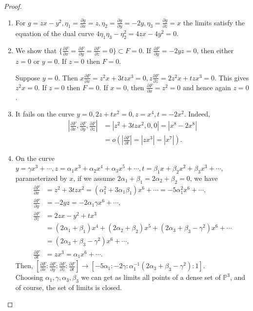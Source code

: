 \documentclass[12pt]{amsart}
\theoremstyle{definition}
\numberwithin{equation}{section}
\begin{document}
\begin {proof}
\begin{enumerate}
\item
For $g=zx-y^2, \eta_1=\frac{\partial g}{\partial x}=z, \eta_2=\frac{\partial g}{\partial y}=-2y, \eta_3=\frac{\partial g}{\partial z}=x$ the limits satisfy the equation of the dual curve $4\eta_1\eta_3-\eta_2^2=4zx-4y^2=0$.
\item  
We show that $\{\frac { \partial F} {\partial x} =\frac {\partial F} {\partial y} = \frac {\partial F} {\partial z}=0\}\subset F=0$.  
If $\frac {\partial F} {\partial y}=-2yz=0$, then either $z=0$ or $y=0$. 
If $z=0$ then $F=0$. 

Suppose $y=0$.  Then $x\frac {\partial F} {\partial x}=z^2x+3tzx^3=0, z\frac {\partial F} {\partial z}=2z^2x+tzx^3=0$.  
This gives $z^2x=0$. If $z=0$ then $F=0$. If $x=0$, then $\frac {\partial F} {\partial x}=z^2=0$ and hence again $z=0$.
\item 
It fails on the curve $y=0, 2z+tx^2=0, z=x^4, t=-2x^2.$
Indeed, 
\begin{align*}
 \left |\frac {\partial F} {\partial x}, \frac {\partial F} {\partial y}, \frac {\partial F} {\partial z} \right | &=|z^2+3tzx^2,0,0|=|x^8-2x^8| \\ 
& = o\left (\left |\frac {\partial F} {\partial t}\right |=|zx^3|=|x^7| \right ). 
\end{align*} 
\item 
On the curve $y=\gamma x^3+ \cdots , z=\alpha_1x^3+\alpha_2x^4+\alpha_3x^5+ \cdots , t=\beta_1x+\beta_2 x^2+\beta_3x^3+ \cdots $, parameterized by $x$,  if we assume $2\alpha_1+\beta_1=2\alpha_2+\beta_2=0$, we have 
\begin{align*}
 \frac {\partial F} {\partial x} & =z^2+3tzx^2=(\alpha_1^2+3\alpha_1\beta_1)x^6+ \cdots =-5\alpha_1^2x^6+ \cdots , \\
 \frac {\partial F} {\partial y} & =-2yz=-2\alpha_1\gamma x^6+ \cdots,\\
   \frac {\partial F} {\partial z} & =2zx -y^2+tx^3  \\ 
& =(2\alpha_1+\beta_1)x^4+ (2\alpha_2  +\beta_2)x^5  +(2\alpha_3+\beta_3-\gamma^2)x^6+ \cdots \\ 
 & =(2\alpha_3+\beta_3-\gamma^2)x^6+ \cdots, \\
  \frac {\partial F} {\partial t} & =zx^3=\alpha_1x^6+ \cdots . 
\end{align*}
Then, $ \left [\frac {\partial F} {\partial x} :  \frac {\partial F} {\partial y} :  \frac {\partial F} {\partial z} :  \frac {\partial F} {\partial t} \right ] \to \left[ -5\alpha_1: -2\gamma : \alpha_1^{-1}(2\alpha_3+\beta_3-\gamma^2) : 1\right]$. \\
Choosing $\alpha_1, \gamma, \alpha_3, \beta_3$ we can get as limits all  points of a dense set of $\mathbb P^3$, and of course, the set of limits is closed.
\end{enumerate}
\end{proof}
\end{document}
